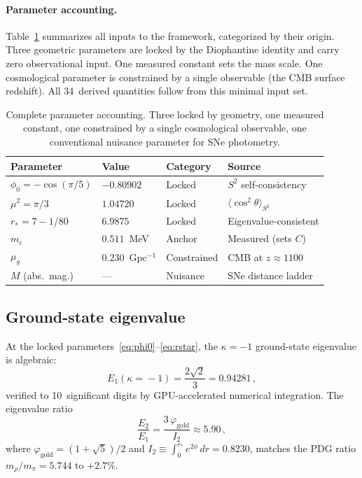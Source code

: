 \documentclass[aps,prd,twocolumn,superscriptaddress,nofootinbib,longbibliography]{revtex4-2}
\newcommand{\rstar}{r_{*}}
\newcommand{\phiz}{\phi_0}
\newcommand{\vgold}{\varphi_{\mathrm{gold}}}
\newcommand{\mug}{\mu_g}
\newcommand{\intdom}{\int_0^{\rstar}}
\begin{document}
\paragraph{Parameter accounting.}
Table~\ref{tab:params} summarizes all inputs to the framework,
categorized by their origin.  Three geometric parameters are locked by
the Diophantine identity and carry zero observational input.  One
measured constant sets the mass scale.  One cosmological parameter is
constrained by a single observable (the CMB surface redshift).  All
34~derived quantities follow from this minimal input set.

\begin{table}[h]
\caption{\label{tab:params}%
Complete parameter accounting.  Three locked by geometry, one measured
constant, one constrained by a single cosmological observable, one
conventional nuisance parameter for SNe photometry.}
\begin{ruledtabular}
\begin{tabular}{llll}
Parameter & Value & Category & Source \\
\hline
$\phiz = -\cos(\pi/5)$ & $-0.80902$ & Locked & $S^2$ self-consistency \\
$\mu^2 = \pi/3$ & $1.04720$ & Locked & $\langle\cos^2\theta\rangle_{S^2}$ \\
$\rstar = 7 - 1/80$ & $6.9875$ & Locked & Eigenvalue-consistent \\
$m_e$ & $0.511$~MeV & Anchor & Measured (sets $C$) \\
$\mug$ & $0.230$~Gpc$^{-1}$ & Constrained & CMB at $z \approx 1100$ \\
$M$ (abs.\ mag.) & --- & Nuisance & SNe distance ladder \\
\end{tabular}
\end{ruledtabular}
\end{table}

\subsection{Ground-state eigenvalue}

At the locked parameters~\eqref{eq:phi0}--\eqref{eq:rstar}, the
$\kappa = -1$ ground-state eigenvalue is algebraic:
\begin{equation}\label{eq:E1}
  E_1(\kappa\!=\!-1) = \frac{2\sqrt{2}}{3} = 0.94281\,,
\end{equation}
verified to 10~significant digits by GPU-accelerated numerical
integration.  The eigenvalue ratio
\begin{equation}\label{eq:E2E1}
  \frac{E_2}{E_1} = \frac{3\,\vgold}{I_2} \approx 5.90\,,
\end{equation}
where $\vgold = (1+\sqrt{5})/2$ and
$I_2 \equiv \intdom e^{2\phi}\,dr = 0.8230$, matches the PDG ratio
$m_\rho/m_\pi = 5.744$ to $+2.7\%$.
\end{document}
